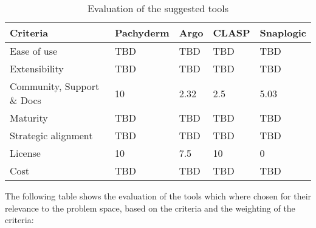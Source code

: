 \begin{table}[htb]
    \centering
    \begin{tabular}{|l|l|l|l|l|} \hline
        \textbf{Criteria}                                          & \textbf{Pachyderm}    & \textbf{Argo}         & \textbf{\ac{CLASP}}   & \textbf{Snaplogic}     \\ \hline
        Ease of use                                                & TBD                   & TBD                   & TBD                   & TBD                    \\ \hline
        Extensibility                                              & TBD                   & TBD                   & TBD                   & TBD                    \\ \hline
        Community, Support \& Docs                                 & 10                   & 2.32                   & 2.5                   & 5.03                   \\ \hline
        Maturity                                                   & TBD                   & TBD                   & TBD                   & TBD                    \\ \hline
        Strategic alignment                                        & TBD                   & TBD                   & TBD                   & TBD                    \\ \hline
        License                                                    & 10                    & 7.5                     & 10                    & 0                      \\ \hline
        Cost                                                       & TBD                   & TBD                   & TBD                   & TBD                    \\ \hline

    \end{tabular}
    \caption{Evaluation of the suggested tools}
    \label{tab:evaluation_of_the_suggested_tools}
\end{table}

The following table shows the evaluation of the tools which where chosen for their relevance to the problem space, based on the criteria and the weighting of the criteria:

